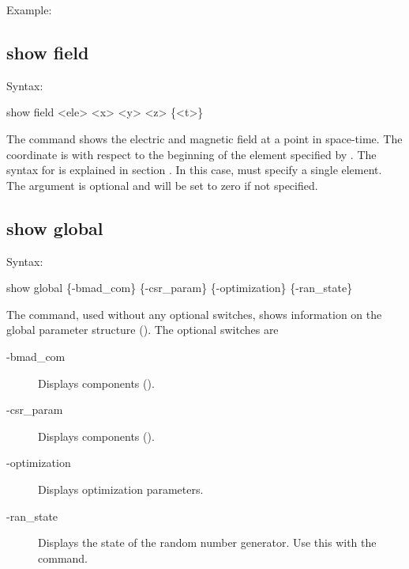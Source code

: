 {{{{{Example:


\subsection{show field}
\label{s:show.field}

Syntax:
\begin{example}
  show field <ele> <x> <y> <z> \{<t>\}
\end{example}

The  command shows the electric and magnetic field at a point in
space-time. The  coordinate is with respect to the beginning of the element
specified by . The syntax for  is explained in section
. In this case,  must specify a single element.
The  argument is optional and will be set to zero if not specified.


\subsection{show global}
\label{s:show.global}

Syntax:
\begin{example}
  show global \{-bmad_com\} \{-csr_param\} \{-optimization\} \{-ran_state\} 
\end{example}


The  command, used without any optional switches,
shows information on the global parameter structure
(). The optional switches are
  \begin{description}
  \item[-bmad_com] \Newline
Displays  components ().
  \item[-csr_param] \Newline
Displays  components ().
  \item[-optimization] \Newline
Displays optimization parameters.
  \item[-ran_state] \Newline
Displays the state of the random number generator. Use this with the
 command.
  \end{description}

}}}}}
